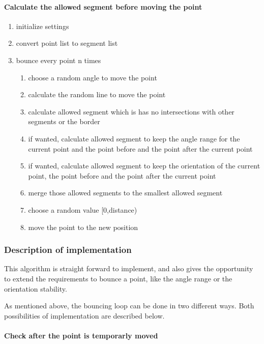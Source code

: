 \paragraph{Calculate the allowed segment before moving the point}
\begin{enumerate}
  \item initialize settings
  \item convert point list to segment list
  \item bounce every point n times
  \begin{enumerate}
    \item choose a random angle to move the point
    \item calculate the random line to move the point
    \item calculate allowed segment which is has no intersections with other
      segments or the border
    \item if wanted, calculate allowed segment to keep the angle range for the
      current point and the point before and the point after the current point
    \item if wanted, calculate allowed segment to keep the orientation of the
      current point, the point before and the point after the current point
    \item merge those allowed segments to the smallest allowed segment
    \item choose a random value [0,distance)
    \item move the point to the new position
  \end{enumerate}
\end{enumerate}

\subsubsection{Description of implementation}
This algorithm is straight forward to implement, and also gives the
opportunity to extend the requirements to bounce a point, like the
angle range or the orientation stability.

As mentioned above, the bouncing loop can be done in two different
ways. Both possibilities of implementation are described below.

\paragraph{Check after the point is temporarly moved}

